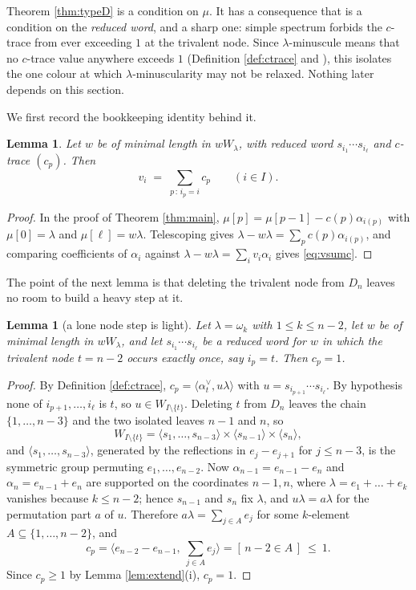 \documentclass[reqno]{amsart}
\theoremstyle{plain}
\newtheorem{lemma}[theorem]{Lemma}
\theoremstyle{definition}
\newcommand{\la}{\lambda}
\newcommand{\al}{\alpha}
\newcommand{\om}{\omega}
\begin{document}
Theorem \ref{thm:typeD} is a condition on $\mu$.  It has a consequence that is
a condition on the \emph{reduced word}, and a sharp one: simple spectrum
forbids the $c$-trace from ever exceeding $1$ at the trivalent node.  Since
$\la$-minuscule means that no $c$-trace value anywhere exceeds $1$
(Definition \ref{def:ctrace} and \cite[Def.~5.1]{DKK}), this isolates the one
colour at which $\la$-minuscularity may not be relaxed.  Nothing later depends
on this section.

We first record the bookkeeping identity behind it.

\begin{lemma}\label{lem:vsumc}
Let $w$ be of minimal length in $wW_\la$, with reduced word
$s_{i_1}\cdots s_{i_\ell}$ and $c$-trace $(c_p)$.  Then
\begin{equation}\label{eq:vsumc}
   v_i\;=\;\sum_{p\,:\,i_p=i}c_p\qquad(i\in I).
\end{equation}
\end{lemma}

\begin{proof}
In the proof of Theorem \ref{thm:main}, $\mu[p]=\mu[p-1]-c(p)\al_{i(p)}$ with
$\mu[0]=\la$ and $\mu[\ell]=w\la$.  Telescoping gives
$\la-w\la=\sum_pc(p)\al_{i(p)}$, and comparing coefficients of $\al_i$ against
$\la-w\la=\sum_iv_i\al_i$ gives \eqref{eq:vsumc}.
\end{proof}

The point of the next lemma is that deleting the trivalent node from $D_n$
leaves no room to build a heavy step at it.

\begin{lemma}[a lone node step is light]\label{lem:loneT}
Let $\la=\om_k$ with $1\le k\le n-2$, let $w$ be of minimal length in
$wW_\la$, and let $s_{i_1}\cdots s_{i_\ell}$ be a reduced word for $w$ in which
the trivalent node $t=n-2$ occurs exactly once, say $i_p=t$.  Then $c_p=1$.
\end{lemma}

\begin{proof}
By Definition \ref{def:ctrace}, $c_p=\langle\al_t^\vee,u\la\rangle$ with
$u=s_{i_{p+1}}\cdots s_{i_\ell}$.  By hypothesis none of
$i_{p+1},\dots,i_\ell$ is $t$, so $u\in W_{I\setminus\{t\}}$.  Deleting $t$
from $D_n$ leaves the chain $\{1,\dots,n-3\}$ and the two isolated leaves
$n-1$ and $n$, so
\[
   W_{I\setminus\{t\}}
   =\langle s_1,\dots,s_{n-3}\rangle\times\langle s_{n-1}\rangle
    \times\langle s_n\rangle,
\]
and $\langle s_1,\dots,s_{n-3}\rangle$, generated by the reflections in
$e_j-e_{j+1}$ for $j\le n-3$, is the symmetric group permuting
$e_1,\dots,e_{n-2}$.  Now $\al_{n-1}=e_{n-1}-e_n$ and $\al_n=e_{n-1}+e_n$ are
supported on the coordinates $n-1,n$, where $\la=e_1+\dots+e_k$ vanishes
because $k\le n-2$; hence $s_{n-1}$ and $s_n$ fix $\la$, and $u\la=a\la$ for
the permutation part $a$ of $u$.  Therefore $a\la=\sum_{j\in A}e_j$ for some
$k$-element $A\subseteq\{1,\dots,n-2\}$, and
\[
   c_p=\Big\langle e_{n-2}-e_{n-1},\ \sum_{j\in A}e_j\Big\rangle
   =[\,n-2\in A\,]\ \le\ 1 .
\]
Since $c_p\ge1$ by Lemma \ref{lem:extend}(i), $c_p=1$.
\end{proof}
\end{document}
